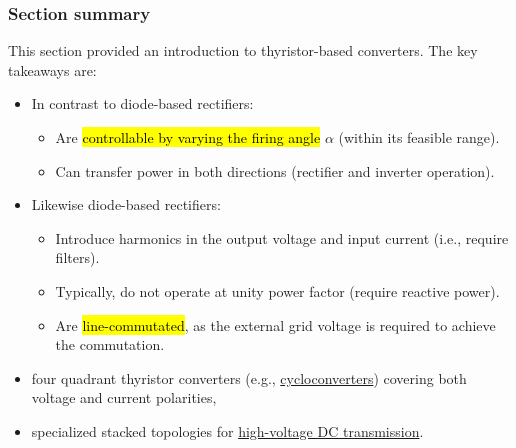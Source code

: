 \begin{frame}
	\frametitle{Section summary}
	This section provided an introduction to thyristor-based converters. The key takeaways are:
	\begin{itemize}
		\item<2-> In contrast to diode-based rectifiers:
		      \begin{itemize}
			      \item<2-> Are \hl{controllable by varying the firing angle} $\alpha$ (within its feasible range).
			      \item<3-> Can transfer power in both directions (rectifier and inverter operation).
		      \end{itemize}
		\item<4-> Likewise diode-based rectifiers:
		      \begin{itemize}
			      \item<4-> Introduce harmonics in the output voltage and input current (i.e., require filters).
			      \item<5-> Typically, do not operate at unity power factor (require reactive power).
			      \item<6-> Are \hl{line-commutated}, as the external grid voltage is required to achieve the commutation.
		      \end{itemize}
	\end{itemize}
	\begin{itemize}
		\item<8-> four quadrant thyristor converters (e.g., \href{https://en.wikipedia.org/wiki/Cycloconverter}{cycloconverters}) covering both voltage and current polarities,
		\item<9-> specialized stacked topologies for \href{https://en.wikipedia.org/wiki/High-voltage_direct_current}{high-voltage DC transmission}.
	\end{itemize}
\end{frame}